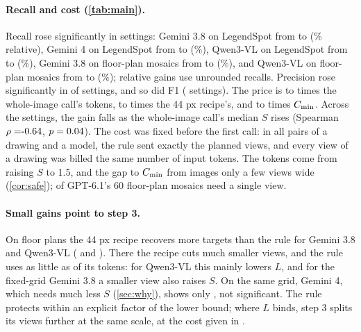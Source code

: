 \paragraph{Recall and cost (\cref{tab:main}).} Recall rose significantly in \CtSigRec{} settings: Gemini 3.8 on LegendSpot from \CtLsGemThreeEightRecW{} to \CtLsGemThreeEightRecR{} (\CtLsGemThreeEightRel\% relative), Gemini 4 on LegendSpot from \CtLsGemFourRecW{} to \CtLsGemFourRecR{} (\CtLsGemFourRel\%), Qwen3-VL on LegendSpot from \CtLsQwenThreevlRecW{} to \CtLsQwenThreevlRecR{} (\CtLsQwenThreevlRel\%), Gemini 3.8 on floor-plan mosaics from \CtFpGemThreeEightRecW{} to \CtFpGemThreeEightRecR{} (\CtFpGemThreeEightRel\%), and Qwen3-VL on floor-plan mosaics from \CtFpQwenThreevlRecW{} to \CtFpQwenThreevlRecR{} (\CtFpQwenThreevlRel\%); relative gains use unrounded recalls. Precision rose significantly in \CtSigPrec{} of \CtCells{} settings, and so did F1 (\CtSigFOne{} settings). The price is \CtTokMin{} to \CtTokMax{} times the whole-image call's tokens, \CtTokDMin{} to \CtTokDMax{} times the 44 px recipe's, and \CtCminMin{} to \CtCminMax{} times $C_{\min}$. Across the \CgainN{} settings, the gain falls as the whole-image call's median $S$ rises (Spearman $\rho = \CgainRhoSw$, $p = 0.04$). The cost was fixed before the first call: in all \CcostPairs{} pairs of a drawing and a model, the rule sent exactly the planned views, and every view of a drawing was billed the same number of input tokens. The tokens come from raising $S$ to 1.5, and the gap to $C_{\min}$ from images only a few views wide (\cref{cor:safe}); \CtOneViewGpt{} of GPT-6.1's 60 floor-plan mosaics need a single view.

\paragraph{Small gains point to step 3.} On floor plans the 44 px recipe recovers more targets than the rule for Gemini 3.8 and Qwen3-VL (\CtFpGemThreeEightdRecD{} and \CtFpQwenThreevldRecD). There the recipe cuts much smaller views, and the rule uses as little as \CtTokDMin{} of its tokens: for Qwen3-VL this mainly lowers $L$, and for the fixed-grid Gemini 3.8 a smaller view also raises $S$. On the same grid, Gemini 4, which needs much less $S$ (\cref{sec:why}), shows only \CtFpGemFourdRecD, not significant. The rule protects within an explicit factor of the lower bound; where $L$ binds, step 3 splits its views further at the same scale, at the cost given in .

